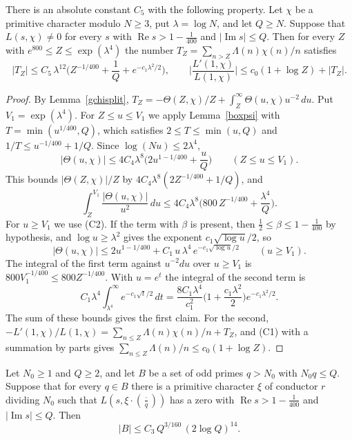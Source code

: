 \begin{proposition}\label{tailprop}
There is an absolute constant $C_5$ with the following property. Let $\chi$ be a primitive character modulo $N\ge3$, put $\lambda=\log N$, and let $Q\ge N$. Suppose that $L(s,\chi)\ne0$ for every $s$ with $\operatorname{Re}s>1-\frac1{400}$ and $\lvert\operatorname{Im}s\rvert\le Q$. Then for every $Z$ with $e^{800}\le Z\le\exp(\lambda^4)$ the number $T_Z=\sum_{n>Z}\Lambda(n)\chi(n)/n$ satisfies
\[
\lvert T_Z\rvert\le C_5\,\lambda^{12}\Big(Z^{-1/400}+\frac1Q+e^{-c_1\lambda^2/2}\Big),\qquad\Big\lvert\frac{L'(1,\chi)}{L(1,\chi)}\Big\rvert\le c_0(1+\log Z)+\lvert T_Z\rvert .
\]
\end{proposition}

\begin{proof}
By Lemma~\ref{gchisplit}, $T_Z=-\Theta(Z,\chi)/Z+\int_Z^\infty\Theta(u,\chi)u^{-2}\,du$. Put $V_1=\exp(\lambda^4)$. For $Z\le u\le V_1$ we apply Lemma~\ref{boxpsi} with $T=\min(u^{1/400},Q)$, which satisfies $2\le T\le\min(u,Q)$ and $1/T\le u^{-1/400}+1/Q$. Since $\log(Nu)\le2\lambda^4$,
\[
\lvert\Theta(u,\chi)\rvert\le4C_4\lambda^8\Big(2u^{1-1/400}+\frac uQ\Big)\qquad(Z\le u\le V_1).
\]
This bounds $\lvert\Theta(Z,\chi)\rvert/Z$ by $4C_4\lambda^8(2Z^{-1/400}+1/Q)$, and
\[
\int_Z^{V_1}\frac{\lvert\Theta(u,\chi)\rvert}{u^2}\,du\le4C_4\lambda^8\Big(800\,Z^{-1/400}+\frac{\lambda^4}Q\Big).
\]
For $u\ge V_1$ we use (C2). If the term with $\beta$ is present, then $\frac12\le\beta\le1-\frac1{400}$ by hypothesis, and $\log u\ge\lambda^2$ gives the exponent $c_1\sqrt{\log u}/2$, so
\[
\lvert\Theta(u,\chi)\rvert\le2u^{1-1/400}+C_1\,u\,\lambda^4\,e^{-c_1\sqrt{\log u}/2}\qquad(u\ge V_1).
\]
The integral of the first term against $u^{-2}du$ over $u\ge V_1$ is $800V_1^{-1/400}\le800Z^{-1/400}$. With $u=e^t$ the integral of the second term is
\[
C_1\lambda^4\int_{\lambda^4}^\infty e^{-c_1\sqrt t/2}\,dt=\frac{8C_1\lambda^4}{c_1^2}\Big(1+\frac{c_1\lambda^2}2\Big)e^{-c_1\lambda^2/2}.
\]
The sum of these bounds gives the first claim. For the second, $-L'(1,\chi)/L(1,\chi)=\sum_{n\le Z}\Lambda(n)\chi(n)/n+T_Z$, and (C1) with a summation by parts gives $\sum_{n\le Z}\Lambda(n)/n\le c_0(1+\log Z)$.
\end{proof}

\begin{proposition}\label{boxes}
Let $N_0\ge1$ and $Q\ge2$, and let $B$ be a set of odd primes $q>N_0$ with $N_0q\le Q$. Suppose that for every $q\in B$ there is a primitive character $\xi$ of conductor $r$ dividing $N_0$ such that $L(s,\xi\cdot(\frac{\cdot}{q}))$ has a zero with $\operatorname{Re}s>1-\frac1{400}$ and $\lvert\operatorname{Im}s\rvert\le Q$. Then
\[
\lvert B\rvert\le C_3\,Q^{3/160}\,(2\log Q)^{14}.
\]
\end{proposition}


